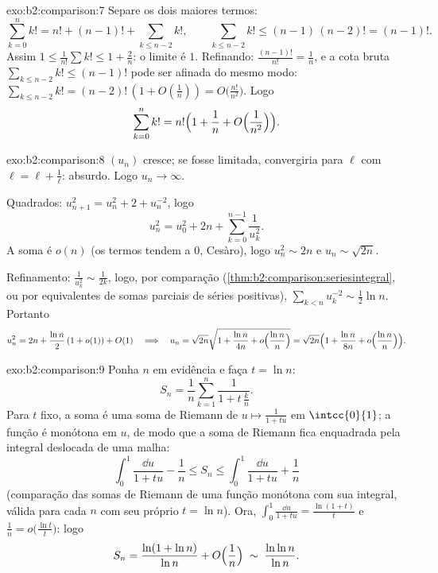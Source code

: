 \begin{solution}{exo:b2:comparison:7}
Separe os dois maiores termos:
\[
\sum_{k=0}^{n} k! = n! + (n-1)! + \sum_{k \leq n-2} k! ,
\qquad
\sum_{k\leq n-2} k! \leq (n-1)\,(n-2)! = (n-1)! .
\]
Assim $1 \leq \frac{1}{n!}\sum k! \leq 1 + \frac{2}{n}$: o limite é
$1$. Refinando: $\frac{(n-1)!}{n!} = \frac1n$, e a cota bruta
$\sum_{k \leq n-2}k! \leq (n-1)!$ pode ser afinada do mesmo modo:
$\sum_{k\leq n-2} k! = (n-2)!\,(1 + O(\frac1n)) = O\bigl(\frac{n!}{n^2}\bigr)$.
Logo
\[
\sum_{k=0}^{n} k! = n!\Bigl(1 + \frac1n + O\Bigl(\frac{1}{n^2}\Bigr)\Bigr).
\]
\end{solution}

\begin{solution}{exo:b2:comparison:8}
$(u_n)$ cresce; se fosse limitada, convergiria para $\ell$ com
$\ell = \ell + \frac1\ell$: absurdo. Logo $u_n \to \infty$.

Quadrados: $u_{n+1}^2 = u_n^2 + 2 + u_n^{-2}$, logo
\[
u_n^2 = u_0^2 + 2n + \sum_{k=0}^{n-1} \frac{1}{u_k^2} .
\]
A soma é $o(n)$ (os termos tendem a $0$, Cesàro), logo $u_n^2 \sim 2n$
e $u_n \sim \sqrt{2n}$.

Refinamento: $\frac{1}{u_k^2} \sim \frac{1}{2k}$, logo, por comparação
(\cref{thm:b2:comparison:seriesintegral}, ou por equivalentes de somas
parciais de séries positivas), $\sum_{k<n} u_k^{-2} \sim \frac12 \ln n$.
Portanto
\[
u_n^2 = 2n + \frac{\ln n}{2}\,(1 + o(1)) + O(1)
\quad\Longrightarrow\quad
u_n = \sqrt{2n}\sqrt{1 + \frac{\ln n}{4n} + o\Bigl(\frac{\ln
n}{n}\Bigr)}
= \sqrt{2n}\Bigl(1 + \frac{\ln n}{8n} + o\Bigl(\frac{\ln
n}{n}\Bigr)\Bigr).
\]
\end{solution}

\begin{solution}{exo:b2:comparison:9}
Ponha $n$ em evidência e faça $t = \ln n$:
\[
S_n = \frac1n \sum_{k=1}^{n} \frac{1}{1 + t\,\frac kn} .
\]
Para $t$ fixo, a soma é uma soma de Riemann de $u \mapsto \frac{1}{1 +
tu}$ em $\intcc{0}{1}$; a função é monótona em $u$, de modo que a
soma de Riemann fica enquadrada pela integral deslocada de uma malha:
\[
\int_0^1 \frac{\dd u}{1 + tu} - \frac1n
\leq S_n \leq \int_0^1 \frac{\dd u}{1 + tu} + \frac1n
\]
(comparação das somas de Riemann de uma função monótona com sua
integral, válida para cada $n$ com seu próprio $t = \ln n$). Ora,
$\int_0^1 \frac{\dd u}{1 + tu} = \frac{\ln(1 + t)}{t}$ e
$\frac1n = o\bigl(\frac{\ln t}{t}\bigr)$: logo
\[
S_n = \frac{\ln(1 + \ln n)}{\ln n} + O\Bigl(\frac 1n\Bigr)
\;\sim\; \frac{\ln\ln n}{\ln n} .
\]
\end{solution}

